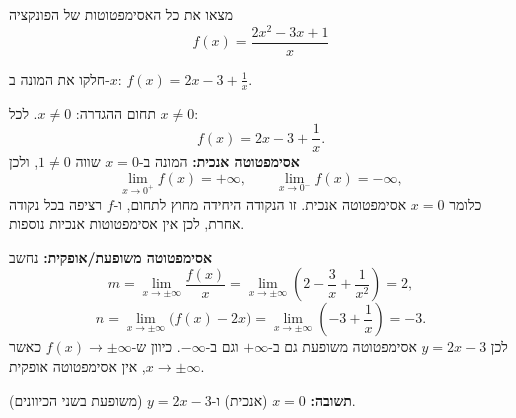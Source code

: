 
\begin{question}
מצאו את כל האסימפטוטות של הפונקציה
\[ f(x)=\frac{2x^2-3x+1}{x} \]
\end{question}

\begin{hint}
חלקו את המונה ב-$x$: $f(x)=2x-3+\frac1x$.
\end{hint}

\begin{solution}
תחום ההגדרה: $x\neq0$. לכל $x\neq 0$:
\[ f(x)=2x-3+\frac{1}{x}. \]
\textbf{אסימפטוטה אנכית:} המונה ב-$x=0$ שווה $1\neq0$, ולכן
\[ \lim_{x\to0^+}f(x)=+\infty,\qquad \lim_{x\to0^-}f(x)=-\infty, \]
כלומר $x=0$ אסימפטוטה אנכית. זו הנקודה היחידה מחוץ לתחום, ו-$f$ רציפה בכל נקודה אחרת, לכן אין אסימפטוטות אנכיות נוספות.

\textbf{אסימפטוטה משופעת/אופקית:} נחשב
\[ m=\lim_{x\to\pm\infty}\frac{f(x)}{x}=\lim_{x\to\pm\infty}\left(2-\frac3x+\frac1{x^2}\right)=2, \]
\[ n=\lim_{x\to\pm\infty}\big(f(x)-2x\big)=\lim_{x\to\pm\infty}\left(-3+\frac1x\right)=-3. \]
לכן $y=2x-3$ אסימפטוטה משופעת גם ב-$+\infty$ וגם ב-$-\infty$. כיוון ש-$f(x)\to\pm\infty$ כאשר $x\to\pm\infty$, אין אסימפטוטה אופקית.

\textbf{תשובה:} $x=0$ (אנכית) ו-$y=2x-3$ (משופעת בשני הכיוונים).
\end{solution}
